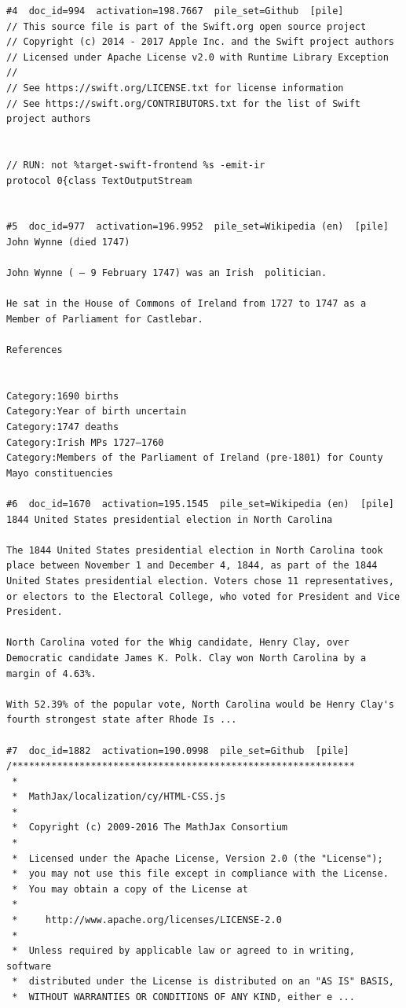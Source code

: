 \begin{verbatim}
#4  doc_id=994  activation=198.7667  pile_set=Github  [pile]
// This source file is part of the Swift.org open source project
// Copyright (c) 2014 - 2017 Apple Inc. and the Swift project authors
// Licensed under Apache License v2.0 with Runtime Library Exception
//
// See https://swift.org/LICENSE.txt for license information
// See https://swift.org/CONTRIBUTORS.txt for the list of Swift project authors


// RUN: not %target-swift-frontend %s -emit-ir
protocol 0{class TextOutputStream


#5  doc_id=977  activation=196.9952  pile_set=Wikipedia (en)  [pile]
John Wynne (died 1747)

John Wynne ( – 9 February 1747) was an Irish  politician.

He sat in the House of Commons of Ireland from 1727 to 1747 as a Member of Parliament for Castlebar.

References 
 

Category:1690 births
Category:Year of birth uncertain
Category:1747 deaths
Category:Irish MPs 1727–1760
Category:Members of the Parliament of Ireland (pre-1801) for County Mayo constituencies

#6  doc_id=1670  activation=195.1545  pile_set=Wikipedia (en)  [pile]
1844 United States presidential election in North Carolina

The 1844 United States presidential election in North Carolina took place between November 1 and December 4, 1844, as part of the 1844 United States presidential election. Voters chose 11 representatives, or electors to the Electoral College, who voted for President and Vice President.

North Carolina voted for the Whig candidate, Henry Clay, over Democratic candidate James K. Polk. Clay won North Carolina by a margin of 4.63%.

With 52.39% of the popular vote, North Carolina would be Henry Clay's fourth strongest state after Rhode Is ...

#7  doc_id=1882  activation=190.0998  pile_set=Github  [pile]
/*************************************************************
 *
 *  MathJax/localization/cy/HTML-CSS.js
 *
 *  Copyright (c) 2009-2016 The MathJax Consortium
 *
 *  Licensed under the Apache License, Version 2.0 (the "License");
 *  you may not use this file except in compliance with the License.
 *  You may obtain a copy of the License at
 *
 *     http://www.apache.org/licenses/LICENSE-2.0
 *
 *  Unless required by applicable law or agreed to in writing, software
 *  distributed under the License is distributed on an "AS IS" BASIS,
 *  WITHOUT WARRANTIES OR CONDITIONS OF ANY KIND, either e ...


\end{verbatim}
